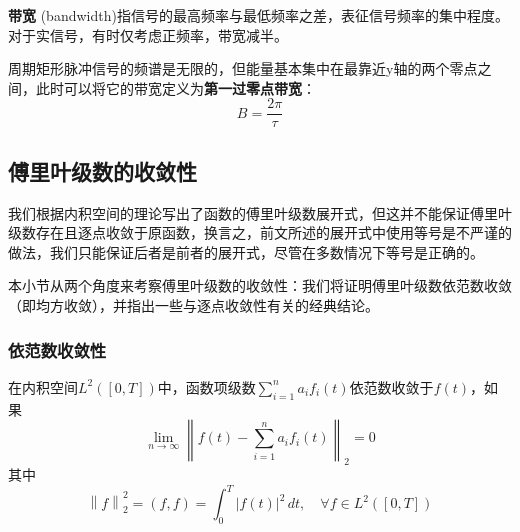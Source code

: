 \begin{definition}[带宽]
    \textbf{带宽} (bandwidth)指信号的最高频率与最低频率之差，表征信号频率的集中程度。对于实信号，有时仅考虑正频率\cite{signal_systems}，带宽减半。

    周期矩形脉冲信号的频谱是无限的，但能量基本集中在最靠近y轴的两个零点之间，此时可以将它的带宽定义为\textbf{第一过零点带宽}：
    $$B=\dfrac{2\pi}{\tau}$$
\end{definition}

\subsection{傅里叶级数的收敛性}\label{sub:fourier_series_convergency}

我们根据内积空间的理论写出了函数的傅里叶级数展开式，但这并不能保证傅里叶级数存在且逐点收敛于原函数，换言之，前文所述的展开式中使用等号是不严谨的做法，我们只能保证后者是前者的展开式，尽管在多数情况下等号是正确的。

本小节从两个角度来考察傅里叶级数的收敛性：我们将证明傅里叶级数依范数收敛（即均方收敛），并指出一些与逐点收敛性有关的经典结论。

\subsubsection{依范数收敛性}

\begin{definition}[依范数收敛]
    在内积空间$L^2([0,T])$中，函数项级数$\sum_{i = 1}^{n}  a_i f_i(t)$依范数收敛于$f(t)$，如果
    \[\lim_{n \to \infty} \left\| f(t)-\sum_{i = 1}^{n}  a_i f_i(t)\right\|_2=0\]
    其中
    \[\left\|f\right\|_2^2=(f,f)=\int_{0}^{T}|f(t)|^2\,dt,\quad\forall f\in L^2([0,T])\]
\end{definition}

